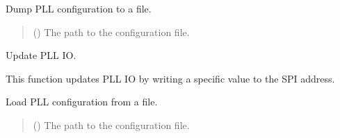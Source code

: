 \documentclass[letterpaper,10pt,english]{sphinxmanual}
\begin{document}
\begin{fulllineitems}
\begin{fulllineitems}
\begin{quote}
\begin{description}
\end{description}\end{quote}

\end{fulllineitems}



\begin{fulllineitems}

\pysigstartsignatures
{}
\pysigstopsignatures
\sphinxAtStartPar
Dump PLL configuration to a file.
\begin{quote}\begin{description}
\sphinxAtStartPar
{} () \textendash{} The path to the configuration file.

\end{description}\end{quote}

\end{fulllineitems}



\begin{fulllineitems}

\pysigstartsignatures
{}
\pysigstopsignatures
\sphinxAtStartPar
Update PLL IO.

\sphinxAtStartPar
This function updates PLL IO by writing a specific value to the SPI address.
\begin{quote}\begin{description}
\sphinxAtStartPar
{} \textendash{} 

\end{description}\end{quote}

\end{fulllineitems}



\begin{fulllineitems}

\pysigstartsignatures
{}
\pysigstopsignatures
\sphinxAtStartPar
Load PLL configuration from a file.
\begin{quote}\begin{description}
\sphinxAtStartPar
{} () \textendash{} The path to the configuration file.


\end{description}
\end{quote}
\end{fulllineitems}
\end{fulllineitems}
\end{document}
